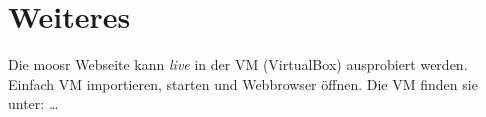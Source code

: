 \chapter{Weiteres}

Die moosr Webseite kann \emph{live} in der VM (VirtualBox) ausprobiert werden.
Einfach VM importieren, starten und Webbrowser öffnen.
Die VM finden sie unter:
\dots
